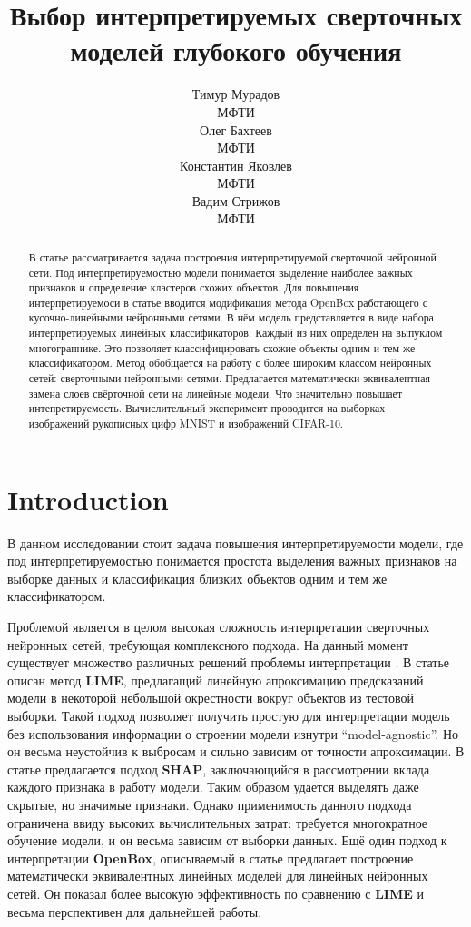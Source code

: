 \documentclass[12pt]{article}
\title{Выбор интерпретируемых сверточных моделей глубокого обучения}
\author{ Тимур Мурадов\\
	МФТИ\\
	\And
	Олег Бахтеев \\
	МФТИ\\
	\And
	Константин Яковлев \\
	МФТИ\\
	\And
	Вадим Стрижов \\
	МФТИ\\
}
\date{}
\begin{document}
\maketitle

\begin{abstract}
	В статье рассматривается задача построения интерпретируемой сверточной нейронной сети. Под интерпретируемостью модели понимается выделение наиболее важных признаков и определение кластеров схожих объектов. Для повышения интерпретируемоси в статье вводится модификация метода OpenBox работающего с  кусочно-линейными нейронными сетями. В нём модель представляется в виде набора интерпретируемых линейных классификаторов. Каждый из них определен на выпуклом многограннике. Это позволяет классифицировать схожие объекты одним и тем же классификатором. Метод обобщается на работу с более широким классом нейронных сетей: сверточными нейронными сетями. Предлагается математически эквивалентная замена слоев свёрточной сети на линейные модели. Что  значительно повышает интепретируемость. Вычислительный эксперимент проводится на выборках изображений рукописных цифр MNIST и изображений CIFAR-10.
\end{abstract}



\section{Introduction}
В данном исследовании стоит задача повышения интерпретируемости модели, где под интерпретируемостью понимается простота выделения важных признаков на выборке данных и классификация близких объектов одним и тем же классификатором.

Проблемой является в целом высокая сложность интерпретации сверточных нейронных сетей, требующая комплексного подхода. На данный момент существует множество различных решений проблемы интерпретации \cite{ribeiro2016why, Lundberg2017aunified, chu2019exact} . В статье \cite{ribeiro2016why} описан метод \textbf{LIME}, предлагащий линейную апроксимацию предсказаний модели в некоторой небольшой окрестности вокруг объектов из тестовой выборки. Такой подход позволяет получить простую для интерпретации модель без использования информации о строении модели изнутри \textquotedblleft model-agnostic\textquotedblright. Но он весьма неустойчив к выбросам и сильно зависим от точности апроксимации. В статье \cite{Lundberg2017aunified} предлагается подход \textbf{SHAP}, заключающийся в рассмотрении вклада каждого признака в работу модели. Таким образом удается выделять даже скрытые, но значимые признаки. Однако применимость данного подхода ограничена ввиду высоких вычислительных затрат: требуется многократное обучение модели, и он весьма зависим от выборки данных. Ещё один подход к интерпретации \textbf{OpenBox}, описываемый в статье \cite{chu2019exact} предлагает построение математически эквивалентных линейных моделей для линейных нейронных сетей. Он показал более высокую эффективность по сравнению с \textbf{LIME} и весьма перспективен для дальнейшей работы.
\end{document}
